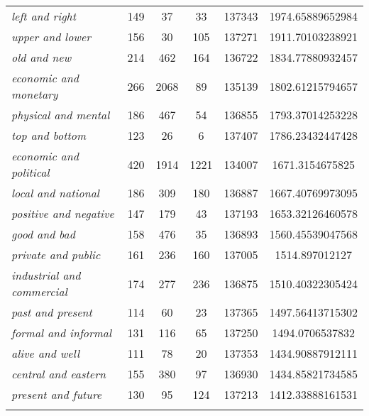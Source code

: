 \begin{table}
{\begin{tabular}[t]{l S[table-format=4] S[table-format=4] S[table-format=4] S[table-format=6] S[table-format=4.2]}
\textit{left and right} & 149 & 37 & 33 & 137343 & 1974.65889652984 \\
\textit{upper and lower} & 156 & 30 & 105 & 137271 & 1911.70103238921 \\
\textit{old and new} & 214 & 462 & 164 & 136722 & 1834.77880932457 \\
\textit{economic and monetary} & 266 & 2068 & 89 & 135139 & 1802.61215794657 \\
\textit{physical and mental} & 186 & 467 & 54 & 136855 & 1793.37014253228 \\
\textit{top and bottom} & 123 & 26 & 6 & 137407 & 1786.23432447428 \\
\textit{economic and political} & 420 & 1914 & 1221 & 134007 & 1671.3154675825 \\
\textit{local and national} & 186 & 309 & 180 & 136887 & 1667.40769973095 \\
\textit{positive and negative} & 147 & 179 & 43 & 137193 & 1653.32126460578 \\
\textit{good and bad} & 158 & 476 & 35 & 136893 & 1560.45539047568 \\
\textit{private and public} & 161 & 236 & 160 & 137005 & 1514.897012127 \\
\textit{industrial and commercial} & 174 & 277 & 236 & 136875 & 1510.40322305424 \\
\textit{past and present} & 114 & 60 & 23 & 137365 & 1497.56413715302 \\
\textit{formal and informal} & 131 & 116 & 65 & 137250 & 1494.0706537832 \\
\textit{alive and well} & 111 & 78 & 20 & 137353 & 1434.90887912111 \\
\textit{central and eastern} & 155 & 380 & 97 & 136930 & 1434.85821734585 \\
\textit{present and future} & 130 & 95 & 124 & 137213 & 1412.33888161531 \\
\lspbottomrule
{} \\ %
\end{tabular}}
\end{table}

